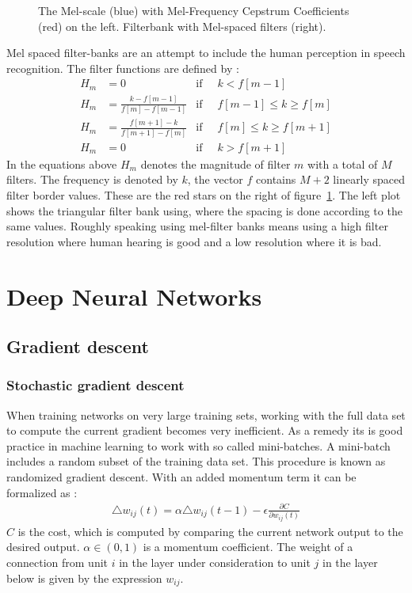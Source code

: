 \begin{figure}
\centering


\caption{The Mel-scale (blue) with Mel-Frequency Cepstrum Coefficients (red)  on the left. Filterbank with Mel-spaced filters (right).}
\label{fig:mel}
\end{figure}
Mel spaced filter-banks are an attempt to include the human perception in speech recognition. The filter functions are defined by \cite[page 317]{Huang2001}:
\begin{align}
H_m &= 0 									   &\text{if}\;\; & k < f[m-1] \\
H_m &= \frac{k      - f[m-1] }{f[m] - f[m-1]}  &\text{if}\;\; & f[m-1] \leq k \geq f[m] \\
H_m &= \frac{f[m+1] - k      }{f[m + 1] - f[m]}&\text{if}\;\; & f[m] \leq k \geq f[m+1] \\
H_m &= 0									   &\text{if}\;\; & k > f[m+1] 
\end{align} 
In the equations above $H_m$ denotes the magnitude of filter $m$ with a total of $M$ filters. The frequency is denoted by $k$, the vector $f$ contains $M+2$ linearly spaced filter border values. These are the red stars on the right of  figure~\ref{fig:mel}. The left plot shows the triangular filter bank using, where the spacing is done according to the same values. Roughly speaking using mel-filter banks means using a high filter resolution where human hearing is good and a low resolution where it is bad. \\




\section{Deep Neural Networks}

\subsection{Gradient descent}

\subsubsection{Stochastic gradient descent}
When training networks on very large training sets, working with the full data set to compute the current gradient becomes very inefficient. As a remedy its is good practice in machine learning to work with so called mini-batches. A mini-batch includes a random subset of the training data set. This procedure is known as randomized gradient descent. With an added momentum term it can be formalized as \cite[page 4]{Hinton2012}:
\begin{align}
\triangle w_{ij}(t) = \alpha \triangle w_{ij}(t-1) - \epsilon \frac{\partial C}{\partial w_{ij}(t)}
\end{align}
$C$ is the cost, which is computed by comparing the current network output to the desired output. $\alpha \in (0,1)$ is a momentum coefficient. The weight of a connection from unit $i$ in the layer under consideration to unit $j$ in the layer below is given by the expression $w_{ij}$.

